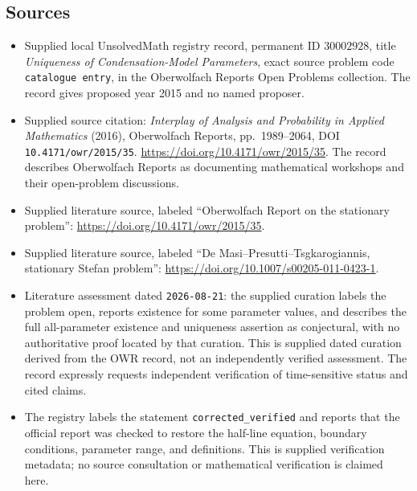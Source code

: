 \documentclass[11pt]{article}
\begin{document}
\subsection{Sources}
\begin{itemize}
\item Supplied local UnsolvedMath registry record, permanent ID \(30002928\), title \emph{Uniqueness of Condensation-Model Parameters}, exact source problem code \texttt{catalogue entry}, in the Oberwolfach Reports Open Problems collection. The record gives proposed year 2015 and no named proposer.
\item Supplied source citation: \emph{Interplay of Analysis and Probability in Applied Mathematics} (2016), Oberwolfach Reports, pp.\ 1989--2064, DOI \texttt{10.4171/owr/2015/35}. \url{https://doi.org/10.4171/owr/2015/35}. The record describes Oberwolfach Reports as documenting mathematical workshops and their open-problem discussions.
\item Supplied literature source, labeled ``Oberwolfach Report on the stationary problem'': \url{https://doi.org/10.4171/owr/2015/35}.
\item Supplied literature source, labeled ``De Masi--Presutti--Tsgkarogiannis, stationary Stefan problem'': \url{https://doi.org/10.1007/s00205-011-0423-1}.
\item Literature assessment dated \texttt{2026-08-21}: the supplied curation labels the problem open, reports existence for some parameter values, and describes the full all-parameter existence and uniqueness assertion as conjectural, with no authoritative proof located by that curation. This is supplied dated curation derived from the OWR record, not an independently verified assessment. The record expressly requests independent verification of time-sensitive status and cited claims.
\item The registry labels the statement \texttt{corrected\_verified} and reports that the official report was checked to restore the half-line equation, boundary conditions, parameter range, and definitions. This is supplied verification metadata; no source consultation or mathematical verification is claimed here.
\end{itemize}
\end{document}
